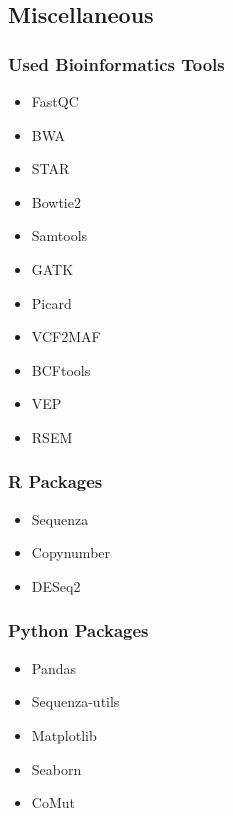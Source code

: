 \documentclass{beamer}
\begin{document}
    \subsection{Miscellaneous}
    \begin{frame}
        \frametitle{Used Bioinformatics Tools}

        \begin{itemize}
            \item FastQC \cite{fastqc1}
            \item BWA \cite{bwa1, bwa2}
            \item STAR \cite{star1}
            \item Bowtie2 \cite{bowtie1}
            \item Samtools \cite{samtools1}
            \item GATK \cite{gatk1, gatk2}
            \item Picard \cite{picard1}
            \item VCF2MAF \cite{vcf2maf1}
            \item BCFtools \cite{bcftools1}
            \item VEP \cite{vep1}
            \item RSEM \cite{RSEM1}
        \end{itemize}
    \end{frame}

    \begin{frame}
        \frametitle{R Packages}

        \begin{itemize}
            \item Sequenza \cite{sequenza1}
            \item Copynumber \cite{copynumber1, copynumber2}
            \item DESeq2 \cite{DESeq1}
        \end{itemize}
    \end{frame}

    \begin{frame}
        \frametitle{Python Packages}

        \begin{itemize}
            \item Pandas \cite{pandas1, pandas2}
            \item Sequenza-utils \cite{sequenza1}
            \item Matplotlib \cite{matplotlib1}
            \item Seaborn \cite{seaborn1}
            \item CoMut \cite{comut1}
        \end{itemize}
    \end{frame}
\end{document}
